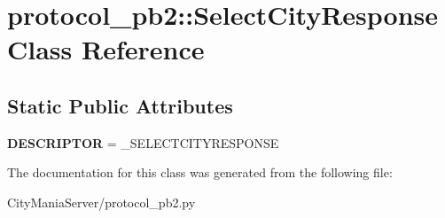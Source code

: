 \hypertarget{classprotocol__pb2_1_1SelectCityResponse}{
\section{protocol\_\-pb2::SelectCityResponse Class Reference}
\label{classprotocol__pb2_1_1SelectCityResponse}
}
\subsection*{Static Public Attributes}
\begin{DoxyCompactItemize}
\item 
\hypertarget{classprotocol__pb2_1_1SelectCityResponse_ac709d1b31a08ade7a482701a501900fe}{
{\bfseries DESCRIPTOR} = \_\-SELECTCITYRESPONSE}
\label{classprotocol__pb2_1_1SelectCityResponse_ac709d1b31a08ade7a482701a501900fe}

\end{DoxyCompactItemize}


The documentation for this class was generated from the following file:\begin{DoxyCompactItemize}
\item 
CityManiaServer/protocol\_\-pb2.py\end{DoxyCompactItemize}
